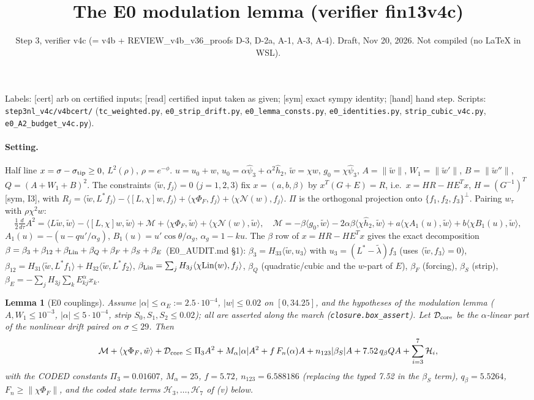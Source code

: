 \documentclass[10pt]{article}
\title{The E0 modulation lemma (verifier fin13v4c)}
\author{Step 3, verifier v4c (= v4b + REVIEW\_v4b\_v36\_proofs D-3, D-2a, A-1, A-3, A-4). Draft, Nov 20, 2026. Not compiled (no \LaTeX{} in WSL).}
\date{}
\newtheorem{lemma}{Lemma}
\newcommand{\wt}{\tilde w}
\newcommand{\ip}[2]{\langle #1,#2\rangle}
\begin{document}
\maketitle
\noindent Labels: [cert] arb on certified inputs; [read] certified input taken as given; [sym] exact sympy identity; [hand] hand step.
Scripts: \texttt{step3nl\_v4c/v4bcert/} (\texttt{tc\_weighted.py}, \texttt{e0\_strip\_drift.py}, \texttt{e0\_lemma\_consts.py}, \texttt{e0\_identities.py}, \texttt{strip\_cubic\_v4c.py}, \texttt{e0\_A2\_budget\_v4c.py}).

\paragraph{Setting.} Half line $x=\sigma-\sigma_{\rm tip}\ge0$, $L^2(\rho)$, $\rho=e^{-\phi}$. $u=u_0+w$, $u_0=\alpha\hat\psi_3+\alpha^2\hat h_2$,
$\wt=\chi w$, $g_0=\chi\hat\psi_3$, $A=\|\wt\|$, $W_1=\|\wt'\|$, $B=\|\wt''\|$, $Q=(A+W_1+B)^2$. The constraints $\ip{\wt}{f_j}=0$ ($j=1,2,3$) fix
$x=(a,b,\beta)$ by $x^T(G+E)=R$, i.e.\ $x=HR-HE^Tx$, $H=(G^{-1})^T$ [sym, I3], with $R_j=\ip{\wt}{L^*f_j}-\ip{[L,\chi]w}{f_j}+\ip{\chi\Phi_F}{f_j}+\ip{\chi\mathcal N(w)}{f_j}$.
$\Pi$ is the orthogonal projection onto $\{f_1,f_2,f_3\}^\perp$. Pairing $w_\tau$ with $\rho\chi^2w$:
\[
\tfrac12\tfrac{d}{d\tau}A^2=\ip{L\wt}{\wt}-\ip{[L,\chi]w}{\wt}+\mathcal M+\ip{\chi\Phi_F}{\wt}+\ip{\chi\mathcal N(w)}{\wt},\quad
\mathcal M=-\beta\ip{g_0}{\wt}-2\alpha\beta\ip{\chi\hat h_2}{\wt}+a\ip{\chi A_1(u)}{\wt}+b\ip{\chi B_1(u)}{\wt},
\]
$A_1(u)=-(u-qu'/\alpha_g)$, $B_1(u)=u'\cos\theta/\alpha_g$, $\alpha_g=1-ku$. The $\beta$ row of $x=HR-HE^Tx$ gives the exact decomposition
$\beta=\beta_3+\beta_{12}+\beta_{\rm Lin}+\beta_Q+\beta_F+\beta_S+\beta_E$ (E0\_AUDIT.md \S1): $\beta_3=H_{33}\ip{\wt}{u_3}$ with $u_3=(L^*-\tilde\lambda)f_3$
(uses $\ip{\wt}{f_3}=0$), $\beta_{12}=H_{31}\ip{\wt}{L^*f_1}+H_{32}\ip{\wt}{L^*f_2}$, $\beta_{\rm Lin}=\sum_jH_{3j}\ip{\chi{\rm Lin}(w)}{f_j}$,
$\beta_Q$ (quadratic/cubic and the $w$-part of $E$), $\beta_F$ (forcing), $\beta_S$ (strip), $\beta_E=-\sum_jH_{3j}\sum_kE^\alpha_{kj}x_k$.

\begin{lemma}[E0 couplings]\label{lem}
Assume $|\alpha|\le\alpha_E:=2.5\cdot10^{-4}$, $|w|\le0.02$ on $[0,34.25]$, and the hypotheses of the modulation lemma
($A,W_1\le10^{-3}$, $|\alpha|\le5\cdot10^{-4}$, strip $S_0,S_1,S_2\le0.02$); all are asserted along the march (\texttt{closure.box\_assert}).
Let $\mathcal D_{\rm core}$ be the $\alpha$-linear part of the nonlinear drift paired on $\sigma\le29$. Then
\[
\mathcal M+\ip{\chi\Phi_F}{\wt}+\mathcal D_{\rm core}\le \Pi_3A^2+M_\alpha|\alpha|A^2+f\,F_n(\alpha)A+n_{123}|\beta_S|A+7.52\,q_\beta QA+\sum_{i=3}^{7}\mathcal H_i,
\]
with the CODED constants $\Pi_3=0.01607$, $M_\alpha=25$, $f=5.72$, $n_{123}=6.588186$ (replacing the typed 7.52 in the $\beta_S$ term),
$q_\beta=5.5264$, $F_n\ge\|\chi\Phi_F\|$, and the coded state terms $\mathcal H_3,\dots,\mathcal H_7$ of (v) below.
\end{lemma}
\end{document}
